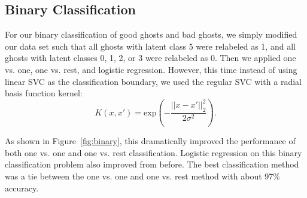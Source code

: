 \documentclass[11pt]{amsart}
\begin{document}
\subsection{Binary Classification}

For our binary classification of good ghosts and bad ghosts, we simply modified our data set such that all ghosts with latent class 5 were relabeled as 1, and all ghosts with latent classes 0, 1, 2, or 3 were relabeled as 0. Then we applied one vs. one, one vs. rest, and logistic regression. However, this time instead of using linear SVC as the classification boundary, we used the regular SVC with a radial basis function kernel:
$$ K(x,x') = \text{exp}\left(-\frac{|| x - x' ||_2^2}{2\sigma^2}\right).$$

As shown in Figure~\ref{fig:binary}, this dramatically improved the performance of both one vs. one and one vs. rest classification. Logistic regression on this binary classification problem also improved from before. The best classification method was a tie between the one vs. one and one vs. rest method with about 97\% accuracy.
\end{document}
